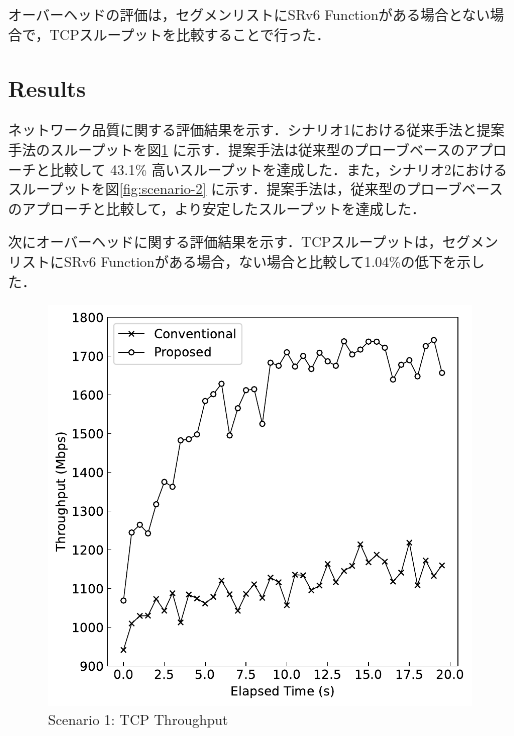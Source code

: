\documentclass[conference]{IEEEtran}
\begin{document}
オーバーヘッドの評価は，セグメンリストにSRv6 Functionがある場合とない場合で，TCPスループットを比較することで行った．

\subsection{Results}




ネットワーク品質に関する評価結果を示す．シナリオ1における従来手法と提案手法のスループットを図\ref{fig:scenario-1} に示す．提案手法は従来型のプローブベースのアプローチと比較して 43.1\% 高いスループットを達成した．また，シナリオ2におけるスループットを図\ref{fig:scenario-2} に示す．提案手法は，従来型のプローブベースのアプローチと比較して，より安定したスループットを達成した．

次にオーバーヘッドに関する評価結果を示す．TCPスループットは，セグメンリストにSRv6 Functionがある場合，ない場合と比較して1.04\%の低下を示した．

\begin{figure}[t]
  \centering
  \includegraphics[width=0.7\linewidth]{./figures/scenario-1.pdf}
  \caption{Scenario 1: TCP Throughput}
  \label{fig:scenario-1}
\end{figure}
\end{document}
